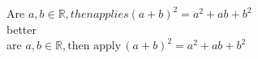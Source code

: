 Are $a, b \in \mathbb{R}, then applies (a+b)^{2} = a^{2} + ab + b^{2} $ \\ 
better \\ 
are $a, b \in \mathbb{R}, \textrm{then apply} \, (a+b)^{2 } = a^{2 } + ab + b^{2}$\\ 
